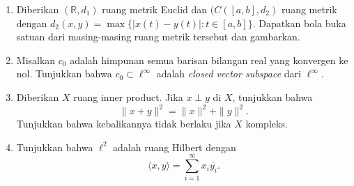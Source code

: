 \documentclass{article}
\theoremstyle{definition}
\begin{document}
  \pagestyle{fancy}

  \begin{enumerate}
    \item Diberikan \( (\mathbb{R}, d_1) \) ruang metrik Euclid dan \( (C([a,b], d_2) \) ruang metrik dengan
    $
        d_2(x, y) = \max \{ |x(t) - y(t)| : t \in [a, b] \}.
    $
    Dapatkan bola buka satuan dari masing-masing ruang metrik tersebut dan gambarkan.

    \item Misalkan \( c_0 \) adalah himpunan semua barisan bilangan real yang konvergen ke nol. Tunjukkan bahwa \( c_0 \subset \ell^\infty \) adalah \textit{closed vector subspace} dari \( \ell^\infty \).

    \item Diberikan \( X \) ruang inner product. Jika \( x \perp y \) di \( X \), tunjukkan bahwa
    \[
        \|x + y\|^2 = \|x\|^2 + \|y\|^2.
    \]
    Tunjukkan bahwa kebalikannya tidak berlaku jika \( X \) kompleks.

    \item Tunjukkan bahwa \( \ell^2 \) adalah ruang Hilbert dengan
    \[
        \langle x, y \rangle = \sum_{i=1}^{\infty} x_i \overline{y_i}.
    \]
\end{enumerate}
\end{document}

